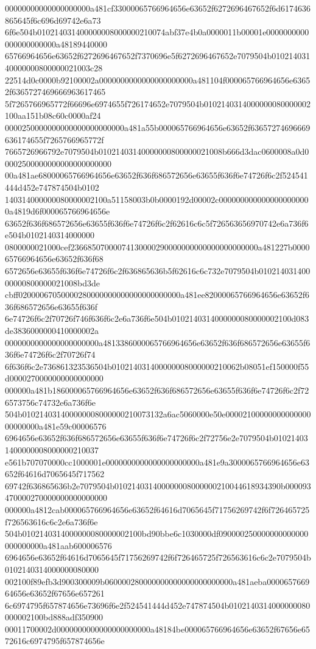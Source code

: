 {00000000000000000000a481cf33000065766964656e63652f6272696467652f6d6174636865645f6c696d69742e6a73
6f6e504b010214031400000008000000210074abf37e4b0a0000011b00001e0000000000000000000000a48189440000
65766964656e63652f6272696467652f7370696e5f6272696467652e7079504b01021403140000000800000021003c28
22514d0c0000b92100002a0000000000000000000000a481104f000065766964656e63652f6365727469666963617465
5f7265766965772f66696e6974655f726174652e7079504b0102140314000000080000002100aa151b08c60c0000af24
0000250000000000000000000000a481a55b000065766964656e63652f63657274696669636174655f7265766965772f
7665726966792e7079504b01021403140000000800000021008b666d3dac0600008a0d00002500000000000000000000
00a481ae68000065766964656e63652f636f686572656e63655f636f6e74726f6c2f524541444d452e747874504b0102
140314000000080000002100a51158003b0b0000192d00002c0000000000000000000000a4819d6f000065766964656e
63652f636f686572656e63655f636f6e74726f6c2f62616c6c5f726563656970742e6a736f6e504b0102140314000000
0800000021000cef23668507000074130000290000000000000000000000a481227b000065766964656e63652f636f68
6572656e63655f636f6e74726f6c2f636865636b5f62616c6c732e7079504b01021403140000000800000021008bd3de
cbff02000067050000280000000000000000000000a481ee82000065766964656e63652f636f686572656e63655f636f
6e74726f6c2f70726f746f636f6c2e6a736f6e504b0102140314000000080000002100d083de3836000000410000002a
0000000000000000000000a4813386000065766964656e63652f636f686572656e63655f636f6e74726f6c2f70726f74
6f636f6c2e736861323536504b010214031400000008000000210062b08051ef150000f55d0000270000000000000000
000000a481b186000065766964656e63652f636f686572656e63655f636f6e74726f6c2f726573756c74732e6a736f6e
504b010214031400000008000000210073132a6ac5060000e50e0000210000000000000000000000a481e59c00006576
6964656e63652f636f686572656e63655f636f6e74726f6c2f72756e2e7079504b010214031400000008000000210037
e561b707070000cc1000001e0000000000000000000000a481e9a3000065766964656e63652f64616d7065645f717562
69742f636865636b2e7079504b010214031400000008000000210044618934390b000093470000270000000000000000
000000a4812cab000065766964656e63652f64616d7065645f71756269742f6f726465725f726563616c6c2e6a736f6e
504b0102140314000000080000002100bd90bbe6c1030000df090000250000000000000000000000a481aab600006576
6964656e63652f64616d7065645f71756269742f6f726465725f726563616c6c2e7079504b0102140314000000080000
002100f89efb3d900300009b060000280000000000000000000000a481aeba000065766964656e63652f67656e657261
6c6974795f657874656e73696f6e2f524541444d452e747874504b0102140314000000080000002100bd888adf350900
00011700002d0000000000000000000000a48184be000065766964656e63652f67656e6572616c6974795f657874656e
}
